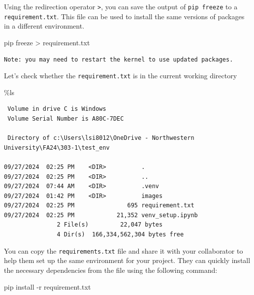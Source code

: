 \documentclass[
  letterpaper,
  DIV=11,
  numbers=noendperiod]{scrreprt}
\newenvironment{Shaded}{\begin{snugshade}}{\end{snugshade}}
\newcommand{\NormalTok}[1]{\textcolor[rgb]{0.00,0.23,0.31}{#1}}
\newcommand{\OperatorTok}[1]{\textcolor[rgb]{0.37,0.37,0.37}{#1}}
\begin{document}
Using the redirection operator \texttt{\textgreater{}}, you can save the
output of \texttt{pip\ freeze} to a \texttt{requirement.txt}. This file
can be used to install the same versions of packages in a different
environment.

\begin{Shaded}
\begin{Highlighting}[]
\NormalTok{pip freeze }\OperatorTok{\textgreater{}}\NormalTok{ requirement.txt}
\end{Highlighting}
\end{Shaded}

\begin{verbatim}
Note: you may need to restart the kernel to use updated packages.
\end{verbatim}

Let's check whether the \texttt{requirement.txt} is in the current
working directory

\begin{Shaded}
\begin{Highlighting}[]
\OperatorTok{\%}\NormalTok{ls}
\end{Highlighting}
\end{Shaded}

\begin{verbatim}
 Volume in drive C is Windows
 Volume Serial Number is A80C-7DEC

 Directory of c:\Users\lsi8012\OneDrive - Northwestern University\FA24\303-1\test_env

09/27/2024  02:25 PM    <DIR>          .
09/27/2024  02:25 PM    <DIR>          ..
09/27/2024  07:44 AM    <DIR>          .venv
09/27/2024  01:42 PM    <DIR>          images
09/27/2024  02:25 PM               695 requirement.txt
09/27/2024  02:25 PM            21,352 venv_setup.ipynb
               2 File(s)         22,047 bytes
               4 Dir(s)  166,334,562,304 bytes free
\end{verbatim}

You can copy the \texttt{requirements.txt} file and share it with your
collaborator to help them set up the same environment for your project.
They can quickly install the necessary dependencies from the file using
the following command:

\begin{Shaded}
\begin{Highlighting}[]
\NormalTok{pip install }\OperatorTok{{-}}\NormalTok{r requirement.txt}
\end{Highlighting}
\end{Shaded}
\end{document}
